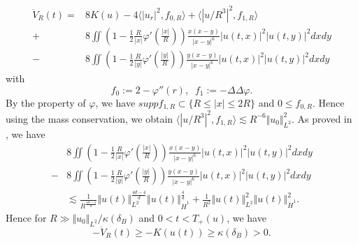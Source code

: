 \documentclass[reqno, 11pt]{amsart}
\numberwithin{equation}{section}
\theoremstyle{plain}
\theoremstyle{definition}
\numberwithin{equation}{section}
\numberwithin{theorem}{section}
\numberwithin{equation}{section}
\numberwithin{equation}{section}
\numberwithin{theorem}{section}
\begin{document}
	\begin{equation}\label{est:V 2deri rad}
	\begin{aligned}
	\ddot{V}_R(t)=&8K(u)-4\langle|u_r|^2,f_{0,R}\rangle + \langle|u/R^{3}|^2,f_{1,R}\rangle \\+& 8\iint \left( 1-\frac{1}{2}\frac{R}{|x|} \varphi' \left( \frac{|x|}{R} \right) \right) \frac{x(x-y)}{|x-y|^6} |u(t,x)|^2|u(t,y)|^2 dxdy\\-&8\iint \left( 1-\frac{1}{2}\frac{R}{|y|} \varphi' \left( \frac{|y|}{R} \right) \right) \frac{y(x-y)}{|x-y|^6} |u(t,x)|^2|u(t,y)|^2 dxdy
	\end{aligned}
	\end{equation}
	with
	\begin{equation*}
	f_0:=2-\varphi''(r), \;\; f_1:=-\Delta\Delta\varphi.
	\end{equation*}
	By the property of $\varphi$, we have $suppf_{1,R}\subset \{R\leq |x|\leq 2R\}$ and $0\leq f_{0,R}$. Hence using the mass conservation, we obtain $
	\langle|u/R^{3}|^2,f_{1,R}\rangle \lesssim R^{-6}\Vert u_0\Vert_{L^2}^2
	$. As proved in \cite[lemma 5.3]{MWX:Hart}, we have
	\begin{equation*}
	\begin{aligned}
	&8\iint \left( 1-\frac{1}{2}\frac{R}{|x|} \varphi' \left( \frac{|x|}{R} \right) \right) \frac{x(x-y)}{|x-y|^6} |u(t,x)|^2|u(t,y)|^2 dxdy\\-&8\iint \left( 1-\frac{1}{2}\frac{R}{|y|} \varphi' \left( \frac{|y|}{R} \right) \right) \frac{y(x-y)}{|x-y|^6} |u(t,x)|^2|u(t,y)|^2 dxdy\\ &\lesssim \frac{1}{R^{\frac{4d-4}{d}}} \Vert u(t)\Vert_{L^2}^{\frac{4d-4}{d}} \Vert u(t)\Vert_{\dot H^1}^{\frac{4}{d}} + \frac{1}{R^2} \Vert u(t)\Vert_{L^2}^{2} \Vert u(t)\Vert_{\dot H^1}^{2}.
	\end{aligned}
	\end{equation*}
	Hence for $R\gg \Vert u_0\Vert_{L^2}/\kappa(\delta_{B})$ and $0<t<T_+(u)$, we have 
	\begin{equation}\label{est:V 2deri bd}
	-\ddot{V}_R(t)\geq -K(u(t)) \geq \kappa(\delta_{B})>0.
	\end{equation}
	
\end{document}
